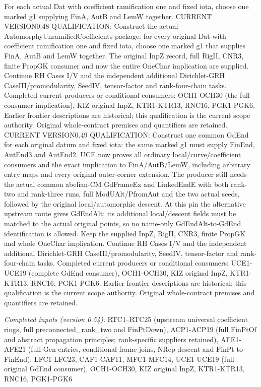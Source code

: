 For each actual Dat with coefficient ramification one and fixed iota, choose one marked g1 supplying FinA, AutB and LemW together. CURRENT VERSION0.48 QUALIFICATION: Construct the actual AutomorphyUnramifiedCoefficients package: for every original Dat with coefficient ramification one and fixed iota, choose one marked g1 that supplies FinA, AutB and LemW together. The original InpZ record, full RigII, CNR3, finite PropGK consumer and now the entire OneChar implication are supplied. Continue RH Cases I/V and the independent additional Dirichlet-GRH CaseIII/promodularity, SeedIV, tensor-factor and rank-four-chain tasks. Completed current producers or conditional consumers: OCH1-OCH30 (the full consumer implication), KIZ original InpZ, KTR1-KTR13, RNC16, PGK1-PGK6. Earlier frontier descriptions are historical; this qualification is the current scope authority. Original whole-contract premises and quantifiers are retained. CURRENT VERSION0.49 QUALIFICATION: Construct one common GdEnd for each original datum and fixed iota: the same marked g1 must supply FinEnd, AutEnd3 and AutEnd2. UCE now proves all ordinary local/curve/coefficient consumers and the exact implication to FinA/AutB/LemW, including arbitrary entry maps and every original outer-corner extension. The producer still needs the actual common abelian-CM GdFrameEx and LinkedEndE with both rank-two and rank-three runs, full ModUAlt/PfromAut and the two actual seeds, followed by the original local/automorphic descent. At this pin the alternative upstream route gives GdEndAlt; its additional local/descent fields must be matched to the actual original points, so no name-only GdEndAlt-to-GdEnd identification is allowed. Keep the supplied InpZ, RigII, CNR3, finite PropGK and whole OneChar implication. Continue RH Cases I/V and the independent additional Dirichlet-GRH CaseIII/promodularity, SeedIV, tensor-factor and rank-four-chain tasks. Completed current producers or conditional consumers: UCE1-UCE19 (complete GdEnd consumer), OCH1-OCH30, KIZ original InpZ, KTR1-KTR13, RNC16, PGK1-PGK6. Earlier frontier descriptions are historical; this qualification is the current scope authority. Original whole-contract premises and quantifiers are retained.

\emph{Completed inputs (version 0.54).} RTC1–RTC25 (upstream universal coefficient rings, full preconnected\_\allowbreak rank\_\allowbreak two and FinPtDown), ACP1-ACP19 (full FinPtOf and abstract propagation principles; rank-specific suppliers retained), AFE1-AFE21 (full Gen entries, conditional frame joins, NRep descent and FinPt-to-FinEnd), LFC1-LFC23, CAF1-CAF11, MFC1-MFC14, UCE1-UCE19 (full original GdEnd consumer), OCH1-OCH30, KIZ original InpZ, KTR1-KTR13, RNC16, PGK1-PGK6

